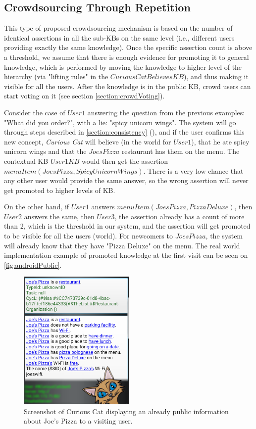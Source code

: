 \subsection{Crowdsourcing Through Repetition}
\label{section:crowdRepetition}
This type of proposed crowdsourcing mechanism is based on the number of 
identical assertions in all the sub-KBs on the same level (i.e., different 
users providing exactly the same knowledge). Once the specific assertion count 
is above a threshold, we assume that there is enough evidence for promoting it 
to general knowledge, which is performed by moving the knowledge to higher 
level of the hierarchy (via "lifting rules" in the $CuriousCatBelievesKB$), 
and thus making it visible for all the users. After the knowledge is in the 
public KB, crowd users can start voting on it (see section 
\ref{section:crowdVoting}).

Consider the case of $User1$ answering the question from the previous examples: 
"What did you order?", with a lie: "spicy unicorn wings". The system will go 
through steps described in \autoref{section:consistency}
(), and if the user confirms this new 
concept, \emph{Curious Cat} will believe (in the world for $User1$), that he 
ate spicy unicorn wings and that the $JoesPizza$ restaurant has them on the
menu. The contextual KB $User1KB$ would then get the assertion 
$menuItem(JoesPizza,SpicyUnicornWings)$. There is a very low chance that any 
other user would provide the same answer, so the wrong assertion will never get 
promoted to higher levels of KB.

On the other hand, if $User1$ answers $menuItem(JoesPizza,PizzaDeluxe)$, then 
$User2$ answers the same, then $User3$, the assertion already has a count of 
more than 2, which is the threshold in our system, and the assertion will get 
promoted to be visible for all the users (world). For newcomers to $JoesPizza$, 
the system will already know that they have "Pizza Deluxe" on the menu.
The real world implementation example of promoted knowledge at the first 
visit can be seen on \autoref{fig:androidPublic}.

\begin{figure}[h]
	\centering
		\includegraphics[width=0.5\textwidth]{figures/androidPublic.png}
	\caption{Screenshot of Curious Cat displaying an already public information about Joe's Pizza to a visiting user.}
	\label{fig:androidPublic}
\end{figure}

